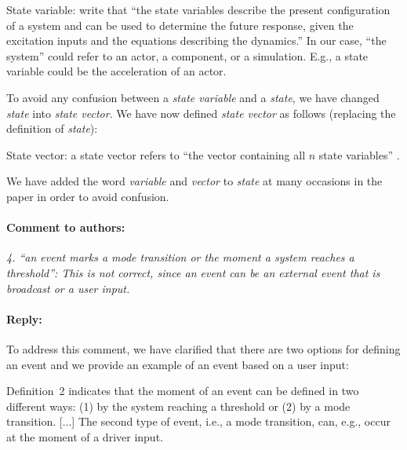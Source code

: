 \documentclass[10pt,final,a4paper,oneside,onecolumn]{article}
\newcommand{\toauthor}{\paragraph*{Comment to authors:} \itshape}
\newcommand{\fromauthor}{\paragraph*{Reply:} \normalfont}
\newcommand{\cstart}{\cbstart\color{red}}
\newcommand{\cend}{\cbend\color{black}}
\begin{document}
\cstart State variable: \textcite[p.~163]{dorf2011modern} write that ``the state variables describe the present configuration of a system and can be used to determine the future response, given the excitation inputs and the equations describing the dynamics.'' In our case, ``the system'' could refer to an actor, a component, or a simulation. E.g., a state variable could be the acceleration of an actor.\cend

To avoid any confusion between a \emph{state variable} and a \emph{state}, we have changed \emph{state} into \emph{state \cstart vector\cend}. We have now defined \emph{state vector} as follows (replacing the definition of \emph{state}):

\cstart State vector: a state vector refers to ``the vector containing all $n$ state variables'' \autocite[p.~233]{dorf2011modern}.\cend

We have added the word \cstart \emph{variable} \cend and \cstart \emph{vector} \cend to \emph{state} at many occasions in the paper in order to avoid confusion.



\toauthor 4. ``an event marks a mode transition or the moment a system reaches a threshold'': This is not correct, since an event can be an external event that is broadcast or a user input.


\fromauthor To address this comment, we have clarified that there are two options for defining an event and we provide an example of an event based on a user input:

\cstart
Definition~2 indicates that the moment of an event can be defined in two different ways: (1) by the system reaching a threshold or (2) by a mode transition. \cend [...] \cstart The second type of event, i.e., a mode transition, can, e.g., occur at the moment of a driver input.\cend
\end{document}
